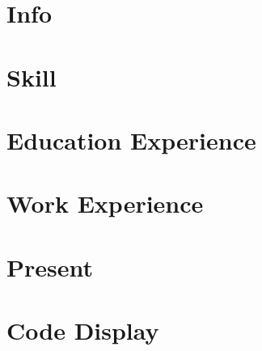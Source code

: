 \documentclass{article}
\begin{document}
	\section*{Info}
		
	\section*{Skill}
		
	\section*{Education Experience}
		
	\section*{Work Experience}
		
	\section*{Present}
		
	\section*{Code Display}
			
			
		
			
\end{document}
